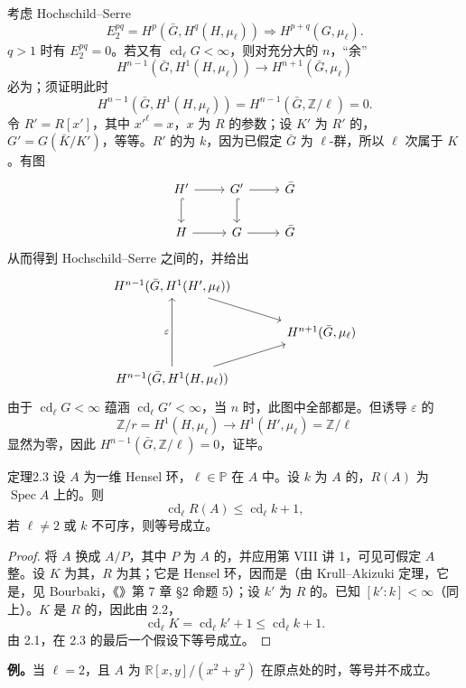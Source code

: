 考虑 Hochschild--Serre 
\[
 E_2^{pq}=H^p(\bar G,H^q(H,\mu_\ell))\Longrightarrow H^{p+q}(G,\mu_\ell).
\]
$q>1$ 时有 $E_2^{pq}=0$。若又有 $\operatorname{cd}_\ell G<\infty$，则对充分大的 $n$，“余”
\[
 H^{n-1}(\bar G,H^1(H,\mu_\ell))\longrightarrow H^{n+1}(\bar G,\mu_\ell)
\]
必为；须证明此时
\[
 H^{n-1}(\bar G,H^1(H,\mu_\ell))=H^{n-1}(\bar G,\mathbb Z/\ell)=0.
\]
令 $R'=R[x']$，其中 $x'^\ell=x$，$x$ 为 $R$ 的参数；设 $K'$ 为 $R'$ 的，$G'=G(\bar K/K')$，等等。$R'$ 的为 $k$，因为已假定 $\bar G$ 为 $\ell$-群，所以 $\ell$ 次属于 $K$。有图
\[
\begin{tikzcd}
H'\arrow[r]\arrow[d,hook]&G'\arrow[r]\arrow[d,hook]&\bar G\\
H\arrow[r]&G\arrow[r]&\bar G
\end{tikzcd}
\]
从而得到 Hochschild--Serre 之间的，并给出
\[
\begin{tikzcd}[column sep=large]
H^{n-1}(\bar G,H^1(H',\mu_\ell))\arrow[dr]&\\
&H^{n+1}(\bar G,\mu_\ell)\\
H^{n-1}(\bar G,H^1(H,\mu_\ell))\arrow[uu,"\varepsilon"]\arrow[ur]&
\end{tikzcd}
\]
由于 $\operatorname{cd}_\ell G<\infty$ 蕴涵 $\operatorname{cd}_\ell G'<\infty$，当 $n$ 时，此图中全部都是。但诱导 $\varepsilon$ 的
\[
 \mathbb Z/r=H^1(H,\mu_\ell)\longrightarrow H^1(H',\mu_\ell)=\mathbb Z/\ell
\]
显然为零，因此 $H^{n-1}(\bar G,\mathbb Z/\ell)=0$，证毕。

\begin{SGAresult}{定理}{2.3}
设 $A$ 为一维 Hensel 环，$\ell\in\mathbb P$ 在 $A$ 中。设 $k$ 为 $A$ 的，$R(A)$ 为 $\operatorname{Spec}A$ 上的。则
\[
 \operatorname{cd}_\ell R(A)\leq\operatorname{cd}_\ell k+1,
\]
若 $\ell\ne2$ 或 $k$ 不可序，则等号成立。
\end{SGAresult}
\begin{proof}
将 $A$ 换成 $A/P$，其中 $P$ 为 $A$ 的，并应用第 VIII 讲 1，可见可假定 $A$ 整。设 $K$ 为其，$R$ 为其；它是 Hensel 环，因而是（由 Krull--Akizuki 定理，它是，见 Bourbaki，《》第 7 章 §2 命题 5）；设 $k'$ 为 $R$ 的。已知 $[k':k]<\infty$（同上）。$K$ 是 $R$ 的，因此由 2.2，
\[
 \operatorname{cd}_\ell K=\operatorname{cd}_\ell k'+1\leq\operatorname{cd}_\ell k+1.
\]
由 2.1，在 2.3 的最后一个假设下等号成立。
\end{proof}
\textbf{例。}当 $\ell=2$，且 $A$ 为 $\mathbb R[x,y]/(x^2+y^2)$ 在原点处的时，等号并不成立。

